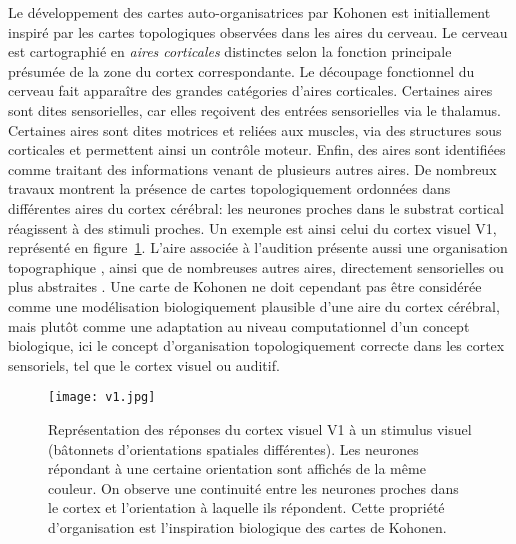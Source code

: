 \documentclass[../main]{subfiles}
\begin{document}
Le développement des cartes auto-organisatrices par Kohonen est initiallement inspiré par les cartes topologiques observées dans les aires du cerveau. 
Le cerveau est cartographié en \emph{aires corticales} distinctes selon la fonction principale présumée de la zone du cortex correspondante.
Le découpage fonctionnel du cerveau fait apparaître des grandes catégories d'aires corticales. Certaines aires sont dites sensorielles, car elles reçoivent des entrées sensorielles via le thalamus. Certaines aires sont dites motrices et reliées aux muscles, via des structures sous corticales et permettent ainsi un contrôle moteur.
Enfin, des aires sont identifiées comme traitant des informations venant de plusieurs autres aires.
De nombreux travaux montrent la présence de cartes topologiquement ordonnées dans différentes aires du cortex cérébral: les neurones proches dans le substrat cortical réagissent à des stimuli proches. 
Un exemple est ainsi celui du cortex visuel V1, représenté en figure~\ref{fig:v1}. 
L'aire associée à l'audition présente aussi une organisation topographique \cite{Reale1980TonotopicOI}, ainsi que de nombreuses autres aires, directement sensorielles ou plus abstraites \cite{Kohonen1995SelfOrganizingM}. 
Une carte de Kohonen ne doit cependant pas être considérée comme une modélisation biologiquement plausible d'une aire du cortex cérébral, mais plutôt comme une adaptation au niveau computationnel d'un concept biologique, ici le concept d'organisation topologiquement correcte dans les cortex sensoriels, tel que le cortex visuel ou auditif.

\begin{figure}
\centering
\texttt{[image: v1.jpg]}
\caption{Représentation des réponses du cortex visuel V1 à un stimulus visuel (bâtonnets d'orientations spatiales différentes). Les neurones répondant à une certaine orientation sont affichés de la même couleur. On observe une continuité entre les neurones proches dans le cortex et l'orientation à laquelle ils répondent. Cette propriété d'organisation est l'inspiration biologique des cartes de Kohonen.}
\label{fig:v1}
\end{figure}
\end{document}
